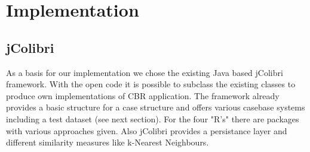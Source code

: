 \documentclass[11pt]{article}
\begin{document}
%
%
%
%
%
%
%
%

\section{Implementation}

\subsection{jColibri}
As a basis for our implementation we chose the existing Java based jColibri framework. With the open code it is possible to subclass the existing classes to produce own implementations of CBR application. The framework already provides a basic structure for a case structure and offers various casebase systems including a test dataset (see next section). For the four "R's" there are packages with various approaches given. Also jColibri provides a persistance layer and different similarity measures like k-Nearest Neighbours.
\end{document}
